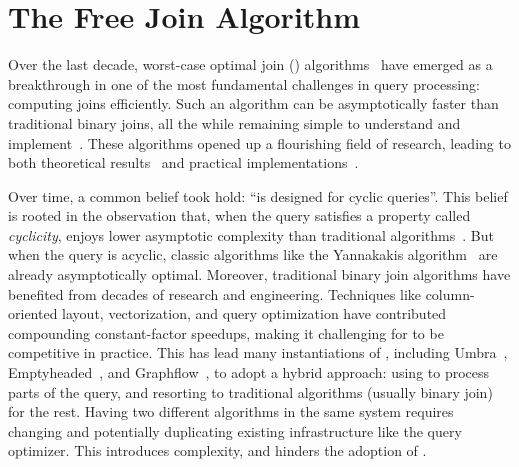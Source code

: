 \chapter{The Free Join Algorithm}
\label{chap:free-join}

Over the last decade, worst-case optimal join (\WCOJ)
algorithms~\cite{DBLP:conf/pods/NgoPRR12, DBLP:conf/icdt/Veldhuizen14,
  DBLP:journals/sigmod/NgoRR13, DBLP:conf/pods/000118} have emerged as
a breakthrough in one of the most fundamental challenges in query
processing: computing joins efficiently.  Such an algorithm can be
asymptotically faster than traditional binary joins, all the while
remaining simple to understand and
implement~\cite{DBLP:journals/sigmod/NgoRR13}.  These algorithms 
opened up a flourishing field of research, leading to both theoretical
results~\cite{DBLP:journals/sigmod/NgoRR13,DBLP:conf/pods/Khamis0S17}
and practical
implementations~\cite{DBLP:conf/icdt/Veldhuizen14,DBLP:journals/tods/AbergerLTNOR17,DBLP:journals/pvldb/FreitagBSKN20, DBLP:journals/pvldb/MhedhbiS19}.

Over time, a common belief took hold: 
  ``\WCOJ is designed for cyclic queries''.
This belief is rooted in the observation that,
 when the query satisfies a property called {\em cyclicity},
  \WCOJ enjoys lower asymptotic complexity 
  than traditional algorithms~\cite{DBLP:journals/sigmod/NgoRR13}.
But when the query is acyclic, 
  classic algorithms like the Yannakakis algorithm~\cite{DBLP:conf/vldb/Yannakakis81} 
  are already asymptotically optimal. 
Moreover, traditional binary join algorithms have benefited from 
  decades of research and engineering.
Techniques like column-oriented layout, vectorization, 
  and query optimization
  have contributed compounding constant-factor speedups,
  making it challenging for \WCOJ to be competitive in practice.
This has lead many instantiations of \WCOJ,
  including Umbra~\cite{DBLP:journals/pvldb/FreitagBSKN20},
   Emptyheaded~\cite{DBLP:journals/tods/AbergerLTNOR17}, and Graphflow~\cite{DBLP:journals/pvldb/MhedhbiS19},
  to adopt a hybrid approach: 
  using \WCOJ to process parts of the query,
  and resorting to traditional algorithms (usually binary join) 
  for the rest.
Having two different algorithms in the same system
  requires changing and potentially duplicating existing infrastructure 
  like the query optimizer. 
This introduces complexity, and hinders the adoption of \WCOJ.

